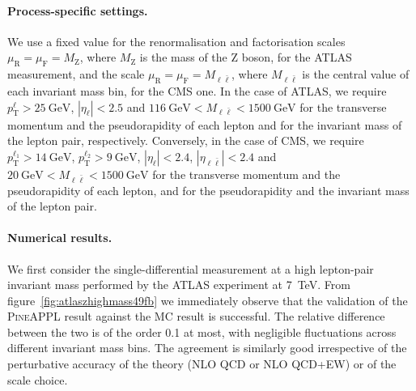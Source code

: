 \paragraph{Process-specific settings.}
We use a fixed value for the renormalisation and factorisation scales $\mu_\mathrm{R}=\mu_\mathrm{F}=M_\mathrm{Z}$, where $M_\mathrm{Z}$ is
the mass of the Z boson, for the ATLAS measurement, and the scale
$\mu_\mathrm{R}=\mu_\mathrm{F}=M_{\ell\bar\ell}$, where $M_{\ell\bar\ell}$ is the central value of each
invariant mass bin, for the CMS one. In the case of ATLAS, we require $p_\mathrm{T}^\ell>\SI{25}{\giga\electronvolt}$,
$|\eta_\ell|<2.5$ and $\SI{116}{\giga\electronvolt}<M_{\ell\bar\ell}<\SI{1500}{\giga\electronvolt}$ for the transverse
momentum and the pseudorapidity of each lepton and for the invariant mass of the
lepton pair, respectively. Conversely, in the case of CMS, we require $p_\mathrm{T}^{\ell_1}>\SI{14}{\giga\electronvolt}$, $p_\mathrm{T}^{\ell_2}>\SI{9}{\giga\electronvolt}$,
$|\eta_\ell|<2.4$, $|\eta_{\ell\bar\ell}|<2.4$ and $\SI{20}{\giga\electronvolt}<M_{\ell\bar\ell}<\SI{1500}{\giga\electronvolt}$
for the transverse momentum and the pseudorapidity of each lepton, and for the
pseudorapidity and the invariant mass of the lepton pair.

\paragraph{Numerical results.}
We first consider the single-differential measurement at a high lepton-pair
invariant mass performed by the ATLAS experiment at \SI{7}{\tera\electronvolt}.
From figure~\ref{fig:atlaszhighmass49fb} we immediately
observe that the validation of the \textsc{PineAPPL} result against the MC
result is successful. The relative difference between the two is of the order
\SI{0.1}{\permille} at most, with negligible fluctuations across different
invariant mass bins. The agreement is similarly good irrespective of the
perturbative accuracy of the theory (NLO QCD or NLO QCD+EW) or of the scale
choice.

